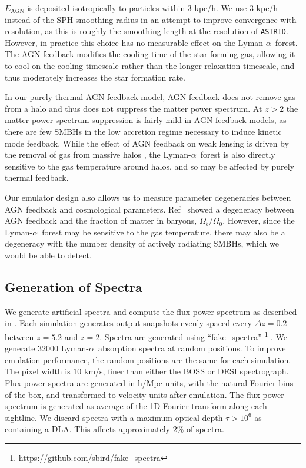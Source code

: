 \documentclass[a4paper,11pt]{article}
\newcommand{\Lya}{Lyman-$\alpha$}
\newcommand{\astrid}{\texttt{ASTRID}}
\begin{document}
$E_\mathrm{AGN}$ is deposited isotropically to particles within $3$ kpc/h. We use $3$ kpc/h instead of the SPH smoothing radius in an attempt to improve convergence with resolution, as this is roughly the smoothing length at the resolution of \astrid. However, in practice this choice has no measurable effect on the \Lya~forest. The AGN feedback modifies the cooling time of the star-forming gas, allowing it to cool on the cooling timescale rather than the longer relaxation timescale, and thus moderately increases the star formation rate.

In our purely thermal AGN feedback model, AGN feedback does not remove gas from a halo and thus does not suppress the matter power spectrum. At $z > 2$ the matter power spectrum suppression is fairly mild in AGN feedback models, as there are few SMBHs in the low accretion regime necessary to induce kinetic mode feedback. While the effect of AGN feedback on weak lensing is driven by the removal of gas from massive halos \cite[e.g.~][]{Giri:2021}, the \Lya~forest is also directly sensitive to the gas temperature around halos, and so may be affected by purely thermal feedback.

Our emulator design also allows us to measure parameter degeneracies between AGN feedback and cosmological parameters. Ref~\cite{Schneider:2015} showed a degeneracy between AGN feedback and the fraction of matter in baryons, $\Omega_b / \Omega_0$. However, since the \Lya~forest may be sensitive to the gas temperature, there may also be a degeneracy with the number density of actively radiating SMBHs, which we would be able to detect.


\subsection{Generation of Spectra}
\label{sec:spectra}

We generate artificial spectra and compute the flux power spectrum as described in \cite{Bird:2019}. Each simulation generates output snapshots evenly spaced every $\Delta z = 0.2$ between $z = 5.2$ and $z = 2$. Spectra are generated using ``fake\_spectra'' \footnote{\url{https://github.com/sbird/fake_spectra}} \cite{FSFE:2017}. We generate $32000$
\Lya~absorption spectra at random positions. To improve emulation performance, the random positions are the same for each simulation. The pixel width is $10$ km/s, finer than either the BOSS or DESI spectrograph. Flux power spectra are generated in h/Mpc units, with the natural Fourier bins of the box, and transformed to velocity units after emulation. The flux power spectrum is generated as average of the 1D Fourier transform along each sightline. We discard spectra with a maximum optical depth $\tau > 10^6$ as containing a DLA. This affects approximately $2\%$ of spectra.
\end{document}
